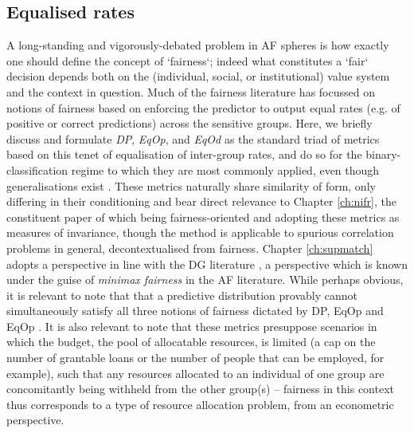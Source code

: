 \subsection{Equalised rates}\label{sec:equalised-rates}
%
A long-standing and vigorously-debated problem in \ac{AF} spheres is how exactly one should define
the concept of `fairness`; indeed what constitutes a `fair` decision depends both on the
(individual, social, or institutional) value system and the context in question.
%
Much of the fairness literature has focussed on notions of fairness based on enforcing the
predictor to output equal rates (e.g. of positive or correct predictions) across the sensitive
groups.
%
Here, we briefly discuss and formulate \emph{\ac{DP}}, \emph{\ac{EqOp}}, and \emph{\ac{EqOd}}
as the standard triad of metrics based on this tenet of equalisation of inter-group rates, and do
so for the binary-classification regime to which they are most commonly applied, even though
generalisations exist \citep{woodworth2017learning}. 
%
These metrics naturally share similarity of form, only differing in their conditioning and bear
direct relevance to Chapter \ref{ch:nifr}, the constituent paper of which being fairness-oriented
and adopting these metrics as measures of invariance, though the method is applicable to spurious
correlation problems in general, decontextualised from fairness.
%
Chapter \ref{ch:supmatch} adopts a perspective in line with the \ac{DG} literature
\cite{sagawa2019distributionally}, a perspective which is known under the guise of \emph{minimax
fairness} in the \ac{AF} literature.
%
While perhaps obvious, it is relevant to note that that a predictive distribution provably cannot
simultaneously satisfy all three notions of fairness dictated by \ac{DP}, \ac{EqOp} and \ac{EqOp}
\citep{kleinberg2016inherent}.
%
It is also relevant to note that these metrics presuppose scenarios in which the budget, the pool
of allocatable resources, is limited (a cap on the number of grantable loans or the number of
people that can be employed, for example), such that any resources allocated to an individual of
one group are concomitantly being withheld from the other group(s) -- fairness in this context thus
corresponds to a type of resource allocation problem, from an econometric perspective.
%

